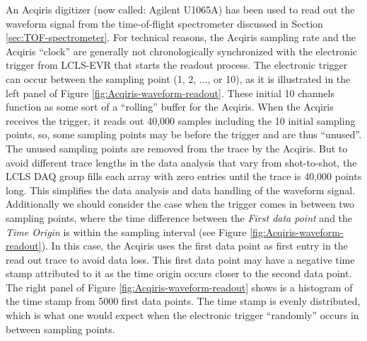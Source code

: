 An Acqiris digitizer (now called: Agilent U1065A) has been used to read out the waveform signal from the time-of-flight spectrometer discussed in Section \ref{sec:TOF-spectrometer}. For technical reasons, the Acqiris sampling rate and the Acqiris ``clock'' are generally not chronologically synchronized with the electronic trigger from LCLS-EVR that starts the readout process. The electronic trigger can occur between the sampling point (1, 2, ..., or 10), as it is illustrated in the left panel of Figure \ref{fig:Acqiris-waveform-readout}. These initial 10 channels function as some sort of a ``rolling'' buffer for the Acqiris. When the Acqiris receives the trigger, it reads out 40,000 samples including the 10 initial sampling points, so, some sampling points may be before the trigger and are thus ``unused''. The unused sampling points are removed from the trace by the Acqiris. But to avoid different trace lengths in the data analysis that vary from shot-to-shot, the LCLS DAQ group fills each array with zero entries until the trace is 40,000 points long. This simplifies the data analysis and data handling of the waveform signal. Additionally we should consider the case when the trigger comes in between two sampling points, where the time difference between the \textit{First data point} and the \textit{Time Origin} is within the sampling interval (see Figure \ref{fig:Acqiris-waveform-readout}). In this case, the Acqiris uses the first data point as first entry in the read out trace to avoid data loss. This first data point may have a negative time stamp attributed to it as the time origin occurs closer to the second data point. The right panel of Figure \ref{fig:Acqiris-waveform-readout} shows is a histogram of the time stamp from 5000 first data points. The time stamp is evenly distributed, which is what one would expect when the electronic trigger ``randomly'' occurs in between sampling points.\\[1\baselineskip]
